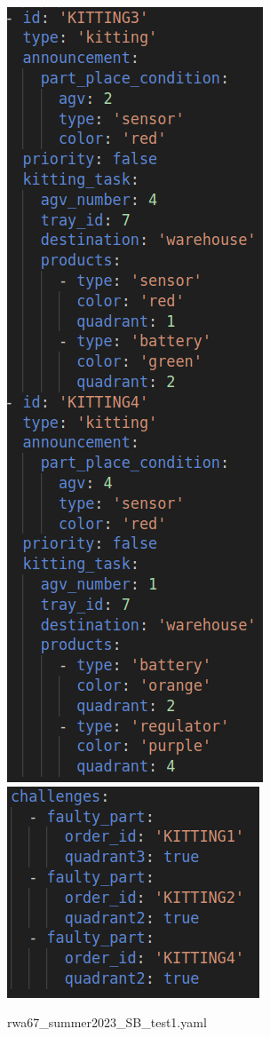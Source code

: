 \documentclass{uva-inf-article}
\begin{document}
\begin{figure}[h]
\includegraphics[scale=0.30]{images/rwa67_trial_4.png}
\includegraphics[scale=0.35]{images/rwa67_trial_5.png}
\caption{rwa67\_summer2023\_SB\_test1.yaml}
\label{fig:SBtest1}
\end{figure}
\end{document}
